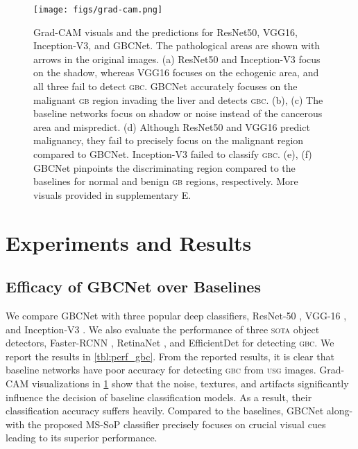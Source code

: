 \documentclass[10pt,twocolumn,letterpaper]{article}
\def\sota{\textsc{sota}\xspace}
\def\usg{\textsc{usg}\xspace}
\def\gbc{\textsc{gbc}\xspace}
\def\gb{\textsc{gb}\xspace}
\begin{document}
 
\begin{figure}[t]
	\centering
	\texttt{[image: figs/grad-cam.png]}
	\caption{Grad-CAM visuals and the predictions for ResNet50, VGG16, Inception-V3, and GBCNet. The pathological areas are shown with arrows in the original images. 
	(a) ResNet50 and Inception-V3 focus on the shadow, whereas VGG16 focuses on the echogenic area, and all three fail to detect \gbc. GBCNet accurately focuses on the malignant \gb region invading the liver and detects \gbc.  (b), (c) The baseline networks focus on shadow or noise instead of the cancerous area and mispredict. 
	(d) Although ResNet50 and VGG16 predict malignancy, they fail to precisely focus on the malignant region compared to GBCNet. Inception-V3 failed to classify \gbc. (e), (f) GBCNet pinpoints the discriminating region compared to the baselines for normal and benign \gb regions, respectively. More visuals provided in supplementary E.} \label{fig:gbc_vis}
\end{figure}

\section{Experiments and Results}
\subsection{Efficacy of GBCNet over Baselines}
We compare GBCNet with three popular deep classifiers, ResNet-50 \cite{resnet}, VGG-16 \cite{vgg}, and Inception-V3 \cite{inception}. We also evaluate the performance of three \sota object detectors, Faster-RCNN \cite{fasterrcnn}, RetinaNet \cite{retinanet}, and EfficientDet \cite{efficientdet} for detecting \gbc. We report the results in \cref{tbl:perf_gbc}. From the reported results, it is clear that baseline networks have poor accuracy for detecting \gbc from \usg images. Grad-CAM \cite{gradcam} visualizations in \cref{fig:gbc_vis} show that the noise, textures, and artifacts significantly influence the decision of baseline classification models. As a result, their classification accuracy suffers heavily. Compared to the baselines, GBCNet along-with the proposed MS-SoP classifier precisely focuses on crucial visual cues leading to its superior performance.
\end{document}
